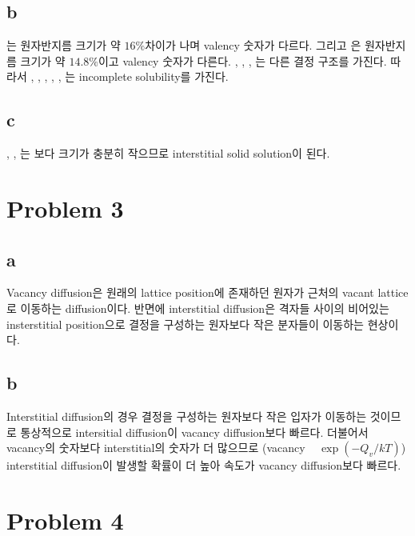 \documentclass[a4paper]{oblivoir}
\begin{document}
\subsection{b}
는 원자반지름 크기가 약 $16\%$차이가 나며 valency 숫자가 다르다. 그리고 은 원자반지름 크기가 약  $14.8\%$이고 valency 숫자가 다른다. , , ,  는 다른 결정 구조를 가진다. 따라서 , , , , , 는 incomplete solubility를 가진다.

\subsection{c}
, , 는 보다 크기가 충분히 작으므로 interstitial solid solution이 된다.

\section{Problem 3}
\subsection{a}
Vacancy diffusion은 원래의 lattice position에 존재하던 원자가 근처의 vacant lattice로 이동하는 diffusion이다. 반면에 interstitial diffusion은 격자들 사이의 비어있는 insterstitial position으로 결정을 구성하는 원자보다 작은 분자들이 이동하는 현상이다.

\subsection{b} 
Interstitial diffusion의 경우 결정을 구성하는 원자보다 작은 입자가 이동하는 것이므로 통상적으로 intersitial diffusion이 vacancy diffusion보다 빠르다. 더불어서 vacancy의 숫자보다 interstitial의 숫자가 더 많으므로 (vacancy ~ $\exp(-Q_{v}/kT)$) interstitial diffusion이 발생할 확률이 더 높아 속도가 vacancy diffusion보다 빠르다.

\section{Problem 4}
\end{document}
